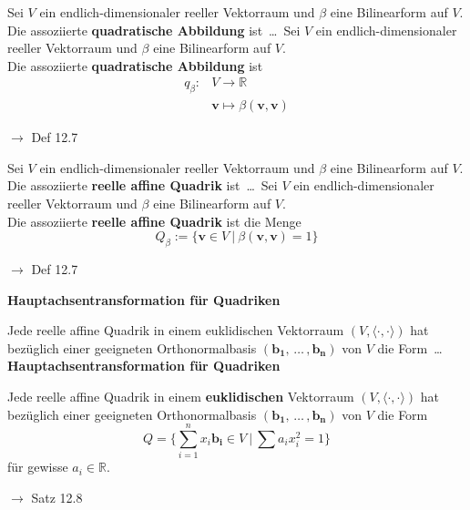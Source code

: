 \documentclass[11pt]{article}
\renewcommand{\cite}[1]{\par\bigskip\hfill{\color{gray}\tiny\(\to\) #1}}
\newcommand{\RR}{\mathbb{R}}
\newcommand*{\scprod}[2]{\langle #1, #2\rangle} %
\renewcommand{\vec}[1]{\mathbf{#1}}
\let\olddots\dots
\renewcommand{\dots}{\,\olddots\,}
\newenvironment{field}{}{\newpage}
\newif\ifnote
\newenvironment{note}{\notetrue}{\notefalse}
\newcommand{\localtag}{}
\newcommand{\globaltag}{}
\newcommand{\uuid}{}
\newcommand{\tags}[1]{
    \ifnote
        \renewcommand{\localtag}{#1}
    \else
        \renewcommand{\globaltag}{#1}
    \fi
    }
\newcommand{\xplain}[1]{\renewcommand{\uuid}{#1}}
\begin{document}
\begin{note}
    \tags{Def}
    \xplain{304525a1-aaed-4d28-93f4-7be8c6841bb1}

    \begin{field}
        Sei $V$ ein endlich-dimensionaler reeller Vektorraum und $\beta$ eine Bilinearform auf $V$.\\
        Die assoziierte \textbf{quadratische Abbildung} ist \dots
    \end{field}
    \begin{field}
        Sei $V$ ein endlich-dimensionaler reeller Vektorraum und $\beta$ eine Bilinearform auf $V$.\\
        Die assoziierte \textbf{quadratische Abbildung} ist
        \begin{align*}
            q_{\beta}: &V \longrightarrow \RR\\
            &\vec{v} \mapsto \beta(\vec{v},\vec{v})
        \end{align*}
        \cite{Def 12.7}
    \end{field}

    \begin{field}
        Sei $V$ ein endlich-dimensionaler reeller Vektorraum und $\beta$ eine Bilinearform auf $V$.\\
        Die assoziierte \textbf{reelle affine Quadrik} ist \dots
    \end{field}
    \begin{field}
        Sei $V$ ein endlich-dimensionaler reeller Vektorraum und $\beta$ eine Bilinearform auf $V$.\\
        Die assoziierte \textbf{reelle affine Quadrik} ist die Menge
        \[Q_{\beta} := \{\vec{v}\in V \ \vert \  \beta(\vec{v},\vec{v}) = 1\}\]
        \cite{Def 12.7}
    \end{field}
\end{note}

\begin{note}
    \tags{Satz}
    \xplain{3754bb2e-25f8-4d9a-bc3e-5418a61ed780}

    \begin{field}
        \textbf{Hauptachsentransformation für Quadriken}

        Jede reelle affine Quadrik in einem euklidischen Vektorraum $(V,\scprod{\cdot}{\cdot})$ hat bezüglich einer geeigneten Orthonormalbasis $(\vec{b_1,\dots,b_n})$ von $V$ die Form \dots
    \end{field}
    \begin{field}
        \textbf{Hauptachsentransformation für Quadriken}

        Jede reelle affine Quadrik in einem \textbf{euklidischen} Vektorraum $(V,\scprod{\cdot}{\cdot})$ hat bezüglich einer geeigneten Orthonormalbasis $(\vec{b_1,\dots,b_n})$ von $V$ die Form
        \[Q = \{\sum_{i=1}^n x_i\vec{b_i}\in V \ \vert \ \sum a_ix_i^2 = 1\}\]
        für gewisse $a_i\in \RR$.
        \cite{Satz 12.8}
    \end{field}
\end{note}
\end{document}
